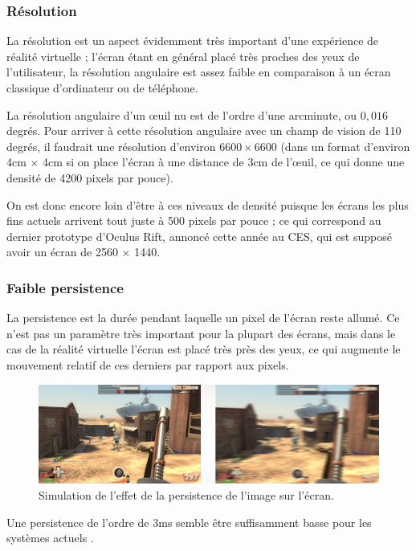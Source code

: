 \documentclass[a4,12pt]{scrartcl}
\begin{document}
\subsubsection{Résolution}

La résolution est un aspect évidemment très important d'une expérience de réalité virtuelle ; l'écran étant en général placé très proches des yeux de l'utilisateur, la résolution angulaire est assez faible en comparaison à un écran classique d'ordinateur ou de téléphone.

La résolution angulaire d'un \oe{}uil nu est de l'ordre d'une arcminute, ou $0,016$ degrés. Pour arriver à cette résolution angulaire avec un champ de vision de 110 degrés, il faudrait une résolution d'environ $6600 \times 6600$ (dans un format d'environ 4cm $\times$ 4cm si on place l'écran à une distance de 3cm de l'\oe{}uil, ce qui donne une densité de 4200 pixels par pouce).

On est donc encore loin d'être à ces niveaux de densité puisque les écrans les plus fins actuels arrivent tout juste à 500 pixels par pouce ; ce qui correspond au dernier prototype d'Oculus Rift, annoncé cette année au CES, qui est supposé avoir un écran de 2560 $\times$ 1440.

\subsubsection{Faible persistence}

La persistence est la durée pendant laquelle un pixel de l'écran reste allumé. Ce n'est pas un paramètre très important pour la plupart des écrans, mais dans le cas de la réalité virtuelle l'écran est placé très près des yeux, ce qui augmente le mouvement relatif de ces derniers par rapport aux pixels.

\begin{figure}[H]
	\centering
	\includegraphics[width=\linewidth]{persistence}
	\caption{Simulation de l'effet de la persistence de l'image sur l'écran.}
\end{figure}

Une persistence de l'ordre de 3ms semble être suffisamment basse pour les systèmes actuels \cite{Abrash14}.
\end{document}
